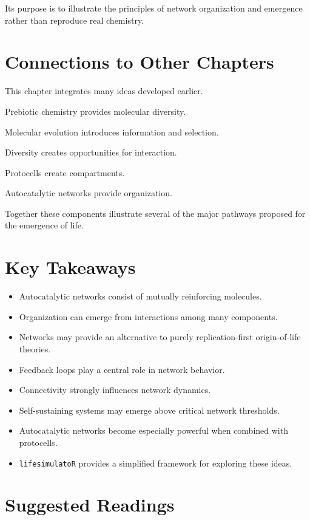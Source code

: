 \documentclass[
  oneside,
  openany]{book}
\providecommand{\tightlist}{%
  \setlength{\itemsep}{0pt}\setlength{\parskip}{0pt}}
\begin{document}
Its purpose is to illustrate the principles of network organization and emergence rather than reproduce real chemistry.

\section{Connections to Other Chapters}\label{connections-to-other-chapters-2}

This chapter integrates many ideas developed earlier.

Prebiotic chemistry provides molecular diversity.

Molecular evolution introduces information and selection.

Diversity creates opportunities for interaction.

Protocells create compartments.

Autocatalytic networks provide organization.

Together these components illustrate several of the major pathways proposed for the emergence of life.

\section{Key Takeaways}\label{key-takeaways-3}

\begin{itemize}
\tightlist
\item
  Autocatalytic networks consist of mutually reinforcing molecules.
\item
  Organization can emerge from interactions among many components.
\item
  Networks may provide an alternative to purely replication-first origin-of-life theories.
\item
  Feedback loops play a central role in network behavior.
\item
  Connectivity strongly influences network dynamics.
\item
  Self-sustaining systems may emerge above critical network thresholds.
\item
  Autocatalytic networks become especially powerful when combined with protocells.
\item
  \texttt{lifesimulatoR} provides a simplified framework for exploring these ideas.
\end{itemize}

\section{Suggested Readings}\label{suggested-readings-3}
\end{document}

